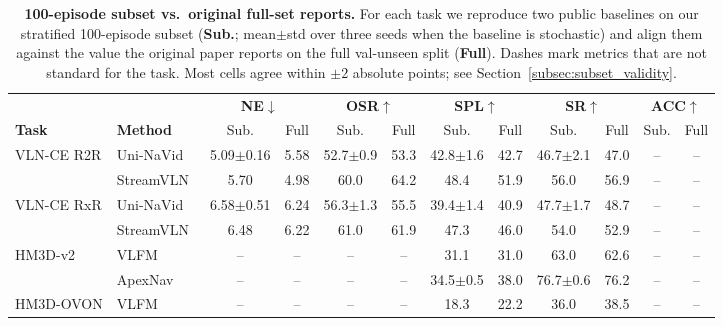\documentclass[conference]{IEEEtran}
\begin{document}
\begin{table}[!t]
\centering
\caption{\textbf{100-episode subset vs.\ original
full-set reports.}  For each task we reproduce two public baselines
on our stratified 100-episode subset (\textbf{Sub.}; mean$\pm$std
over three seeds when the baseline is stochastic) and align them
against the value the original paper reports on the full val-unseen
split (\textbf{Full}).  Dashes mark metrics that are not standard
for the task.  Most cells agree within $\pm 2$ absolute points; see
Section~\ref{subsec:subset_validity}.}
\label{tab:subset_validity}
\vspace{-6pt}
%
{\fontsize{7.5pt}{8.5pt}\selectfont
\setlength{\tabcolsep}{3pt}
\begin{tabular}{ll cc cc cc cc cc}
\toprule
& & \multicolumn{2}{c}{\textbf{NE}$\downarrow$}
  & \multicolumn{2}{c}{\textbf{OSR}$\uparrow$}
  & \multicolumn{2}{c}{\textbf{SPL}$\uparrow$}
  & \multicolumn{2}{c}{\textbf{SR}$\uparrow$}
  & \multicolumn{2}{c}{\textbf{ACC}$\uparrow$} \\
\cmidrule(lr){3-4}\cmidrule(lr){5-6}\cmidrule(lr){7-8}\cmidrule(lr){9-10}\cmidrule(lr){11-12}
\textbf{Task} & \textbf{Method}
  & Sub. & Full & Sub. & Full & Sub. & Full & Sub. & Full & Sub. & Full \\
\midrule
\multirow{2}{*}{VLN-CE R2R}
 & Uni-NaVid~\cite{zhang2024uninavid} & 5.09$\pm$0.16 & 5.58 & 52.7$\pm$0.9 & 53.3 & 42.8$\pm$1.6 & 42.7 & 46.7$\pm$2.1 & 47.0 & -- & -- \\
 & StreamVLN~\cite{wei2025streamvln}  & 5.70          & 4.98 & 60.0         & 64.2 & 48.4         & 51.9 & 56.0         & 56.9 & -- & -- \\
\midrule
\multirow{2}{*}{VLN-CE RxR}
 & Uni-NaVid~\cite{zhang2024uninavid} & 6.58$\pm$0.51 & 6.24 & 56.3$\pm$1.3 & 55.5 & 39.4$\pm$1.4 & 40.9 & 47.7$\pm$1.7 & 48.7 & -- & -- \\
 & StreamVLN~\cite{wei2025streamvln}  & 6.48          & 6.22 & 61.0         & 61.9 & 47.3         & 46.0 & 54.0         & 52.9 & -- & -- \\
\midrule
\multirow{2}{*}{HM3D-v2}
 & VLFM~\cite{yokoyama2024vlfm}       & -- & -- & -- & -- & 31.1         & 31.0 & 63.0         & 62.6 & -- & -- \\
 & ApexNav~\cite{kim2025apexnav}      & -- & -- & -- & -- & 34.5$\pm$0.5 & 38.0 & 76.7$\pm$0.6 & 76.2 & -- & -- \\
\midrule
\multirow{2}{*}{HM3D-OVON}
 & VLFM~\cite{yokoyama2024vlfm}       & -- & -- & -- & -- & 18.3         & 22.2 & 36.0         & 38.5 & -- & -- \\

\end{tabular}}
\end{table}
\end{document}
